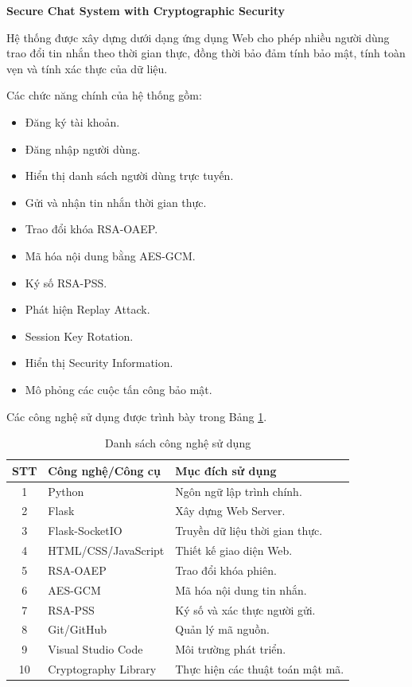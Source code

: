 \begin{center}
\textbf{Secure Chat System with Cryptographic Security}
\end{center}

Hệ thống được xây dựng dưới dạng ứng dụng Web cho phép nhiều người dùng trao đổi tin nhắn theo thời gian thực, đồng thời bảo đảm tính bảo mật, tính toàn vẹn và tính xác thực của dữ liệu.

Các chức năng chính của hệ thống gồm:

\begin{itemize}
    \item Đăng ký tài khoản.
    \item Đăng nhập người dùng.
    \item Hiển thị danh sách người dùng trực tuyến.
    \item Gửi và nhận tin nhắn thời gian thực.
    \item Trao đổi khóa RSA-OAEP.
    \item Mã hóa nội dung bằng AES-GCM.
    \item Ký số RSA-PSS.
    \item Phát hiện Replay Attack.
    \item Session Key Rotation.
    \item Hiển thị Security Information.
    \item Mô phỏng các cuộc tấn công bảo mật.
\end{itemize}

Các công nghệ sử dụng được trình bày trong Bảng \ref{tab:cong-nghe-su-dung}.

\begin{table}[H]
\centering
\caption{Danh sách công nghệ sử dụng}
\label{tab:cong-nghe-su-dung}

\begin{tabular}{|c|p{4cm}|p{8cm}|}
\hline
\textbf{STT} & \textbf{Công nghệ/Công cụ} & \textbf{Mục đích sử dụng} \\
\hline
1 & Python & Ngôn ngữ lập trình chính. \\
\hline
2 & Flask & Xây dựng Web Server. \\
\hline
3 & Flask-SocketIO & Truyền dữ liệu thời gian thực. \\
\hline
4 & HTML/CSS/JavaScript & Thiết kế giao diện Web. \\
\hline
5 & RSA-OAEP & Trao đổi khóa phiên. \\
\hline
6 & AES-GCM & Mã hóa nội dung tin nhắn. \\
\hline
7 & RSA-PSS & Ký số và xác thực người gửi. \\
\hline
8 & Git/GitHub & Quản lý mã nguồn. \\
\hline
9 & Visual Studio Code & Môi trường phát triển. \\
\hline
10 & Cryptography Library & Thực hiện các thuật toán mật mã. \\
\hline
\end{tabular}


\end{table}

